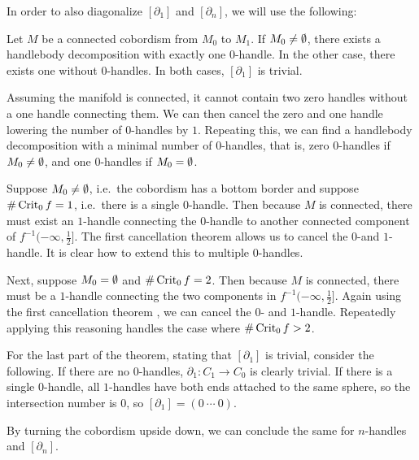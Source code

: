 In order to also diagonalize $[\partial_1]$ and $[\partial_n]$, we will use the following:
\begin{theorem}
    Let $M$ be a connected cobordism from  $ M_0$ to $ M_1$.
    If $ M_0 \neq \emptyset$, there exists a handlebody decomposition with exactly one $0$-handle. In the other case, there exists one without $0$-handles.
    In both cases, $[\partial_1]$ is trivial.
    \label{thm:no-zero}
\end{theorem}
\begin{marginfigure}
    \centering
    \caption{
        Assuming the manifold is connected, it cannot contain two zero handles without a one handle connecting them.
        We can then cancel the zero and one handle lowering the number of $0$-handles by $1$.
        Repeating this, we can find a handlebody decomposition with a minimal number of $0$-handles, that is, zero $0$-handles if $ M_0 \neq \emptyset$, and one $0$-handles if $ M_0 = \emptyset$.
    }
    \label{fig:without-zero-handles}
\end{marginfigure}
\begin{myproof}
    Suppose $M_0 \neq \emptyset$, i.e.\ the cobordism has a bottom border and suppose $\# \operatorname{Crit}_0 f =1$, i.e.\ there is a single $0$-handle.
    Then because $M$ is connected, there must exist an $1$-handle connecting the $0$-handle to another connected component of $f^{-1}(-\infty, \frac{1}{2}]$.
    The first cancellation theorem allows us to cancel the $0$-and  $1$-handle.
    It is clear how to extend this to multiple $0$-handles.

    Next, suppose $M_0 = \emptyset$ and $\# \operatorname{Crit}_0 f  = 2$. Then because $M$ is  connected, there must be a $1$-handle connecting the two components in $f^{-1}(-\infty, \frac{1}{2}]$. Again using the first cancellation theorem , we can cancel the $0$- and $1$-handle. Repeatedly applying this reasoning handles the case where $\# \operatorname{Crit}_0 f > 2$.

    For the last part of the theorem, stating that $[\partial_1]$ is trivial, consider the following. 
    If there are no  $0$-handles, $\partial_1: C_1 \to  C_0$ is clearly trivial.
    If there is a single $0$-handle, all $1$-handles have both ends attached to the same sphere, so the intersection number is $0$, so $[\partial_1] = (0 \ \cdots \ 0)$.
\end{myproof}
\begin{remark}
    By turning the cobordism upside down, we can conclude the same for $n$-handles and $[\partial_n]$.
\end{remark}

